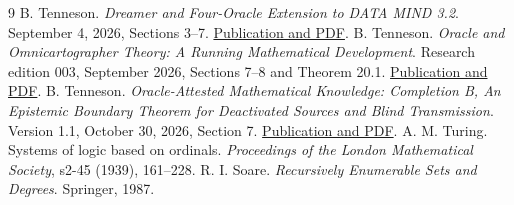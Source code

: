 \documentclass[11pt]{article}
\begin{document}
\begin{thebibliography}{9}
 B. Tenneson. \emph{Dreamer and Four-Oracle Extension to DATA MIND 3.2}. September 4, 2026, Sections 3--7. \href{https://btenneson.github.io/pub/cs.LO_Logic_in_Computer_Science/dreamer_four_oracle_data_mind_3_2/}{Publication and PDF}.
 B. Tenneson. \emph{Oracle and Omnicartographer Theory: A Running Mathematical Development}. Research edition 003, September 2026, Sections 7--8 and Theorem 20.1. \href{https://btenneson.github.io/pub/cs.LO_Logic_in_Computer_Science/oracle_omnicartographer_theory_003/}{Publication and PDF}.
 B. Tenneson. \emph{Oracle-Attested Mathematical Knowledge: Completion B, An Epistemic Boundary Theorem for Deactivated Sources and Blind Transmission}. Version 1.1, October 30, 2026, Section 7. \href{https://btenneson.github.io/pub/cs.LO_Logic_in_Computer_Science/oracle_attested_mathematical_knowledge_fdwc_b_epistemic_boundary_theorem_1_1/}{Publication and PDF}.
 A. M. Turing. Systems of logic based on ordinals. \emph{Proceedings of the London Mathematical Society}, s2-45 (1939), 161--228.
 R. I. Soare. \emph{Recursively Enumerable Sets and Degrees}. Springer, 1987.
\end{thebibliography}
\end{document}
